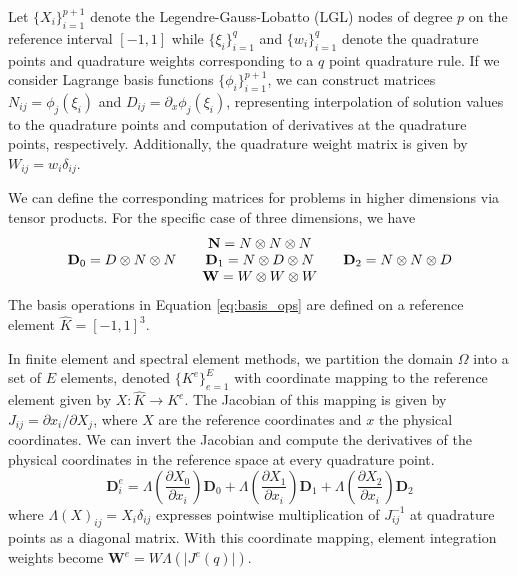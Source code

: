 Let $\lbrace X_i \rbrace_{i = 1}^{p + 1}$ denote the Legendre-Gauss-Lobatto (LGL) nodes of degree $p$ on the reference interval $\left[ -1, 1 \right]$ while $\lbrace \xi_i \rbrace_{i = 1}^q$ and $\lbrace w_i \rbrace_{i = 1}^q$ denote the quadrature points and quadrature weights corresponding to a $q$ point quadrature rule.
If we consider Lagrange basis functions $\lbrace \phi_i \rbrace_{i = 1}^{p + 1}$, we can construct matrices $N_{i j} = \phi_j \left( \xi_i \right)$ and $D_{i j} = \partial_x \phi_j \left( \xi_i \right)$, representing interpolation of solution values to the quadrature points and computation of derivatives at the quadrature points, respectively.
Additionally, the quadrature weight matrix is given by $W_{i j} = w_i \delta_{i j}$.

We can define the corresponding matrices for problems in higher dimensions via tensor products.
For the specific case of three dimensions, we have
\begin{equation}
\begin{tabular}{c}
$\mathbf{N}   = N \otimes N \otimes N$ \\
$\mathbf{D}_0 = D \otimes N \otimes N$ \hspace{5mm}
$\mathbf{D}_1 = N \otimes D \otimes N$ \hspace{5mm}
$\mathbf{D}_2 = N \otimes N \otimes D$ \\
$\mathbf{W}   = W \otimes W \otimes W$
\end{tabular}
\label{eq:basis_ops}
\end{equation}
The basis operations in Equation \ref{eq:basis_ops} are defined on a reference element $\hat{K} = \left[ -1, 1 \right]^3$.

In finite element and spectral element methods, we partition the domain $\Omega$ into a set of $E$ elements, denoted $\lbrace K^e \rbrace_{e = 1}^E$ with coordinate mapping to the reference element given by $X : \hat{K} \rightarrow K^e$.
The Jacobian of this mapping is given by $J_{i j} = \partial x_i / \partial X_j$, where $X$ are the reference coordinates and $x$ the physical coordinates.
We can invert the Jacobian and compute the derivatives of the physical coordinates in the reference space at every quadrature point.
\begin{equation}
\mathbf{D}_i^e = \Lambda \left( \frac{\partial X_0}{\partial x_i} \right) \mathbf{D}_0 + \Lambda \left( \frac{\partial X_1}{\partial x_i} \right) \mathbf{D}_1 + \Lambda \left( \frac{\partial X_2}{\partial x_i} \right) \mathbf{D}_2
\end{equation}
where $\Lambda \left( X \right)_{i j} = X_i \delta_{i j}$ expresses pointwise multiplication of $J_{i j}^{-1}$ at quadrature points as a diagonal matrix.
With this coordinate mapping, element integration weights become $\mathbf{W}^e = W \Lambda \left( \lvert J^e \left( q \right) \rvert \right)$.

